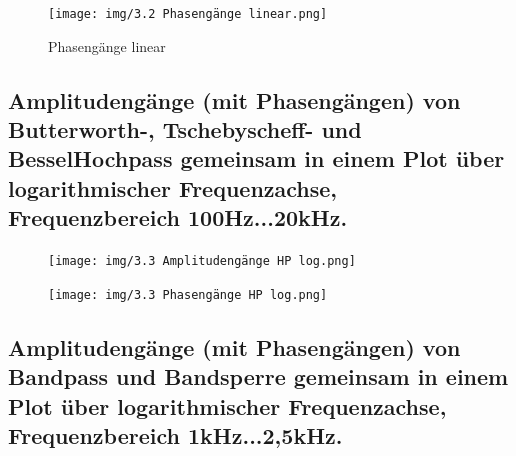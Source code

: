 \begin{figure}[H]
    \begin{center}
        \texttt{[image: img/3.2 Phasengänge linear.png]}
        \caption{Phasengänge linear}
        \label{fig:A1_label}
    \end{center}
\end{figure}




\subsection{Amplitudengänge (mit Phasengängen) von Butterworth-, Tschebyscheff- und BesselHochpass gemeinsam in einem Plot über logarithmischer Frequenzachse, Frequenzbereich 100Hz...20kHz. }

\begin{figure}[H]
    \begin{center}
        \texttt{[image: img/3.3 Amplitudengänge HP log.png]}
        \caption{\imgfilename}
        \label{fig:A1_label}
    \end{center}
\end{figure}
\begin{figure}[H]
    \begin{center}
        \texttt{[image: img/3.3 Phasengänge HP log.png]}
        \caption{\imgfilename}
        \label{fig:A1_label}
    \end{center}
\end{figure}





\subsection{Amplitudengänge (mit Phasengängen) von Bandpass und Bandsperre gemeinsam in einem Plot über logarithmischer Frequenzachse, Frequenzbereich 1kHz...2,5kHz. }
 

